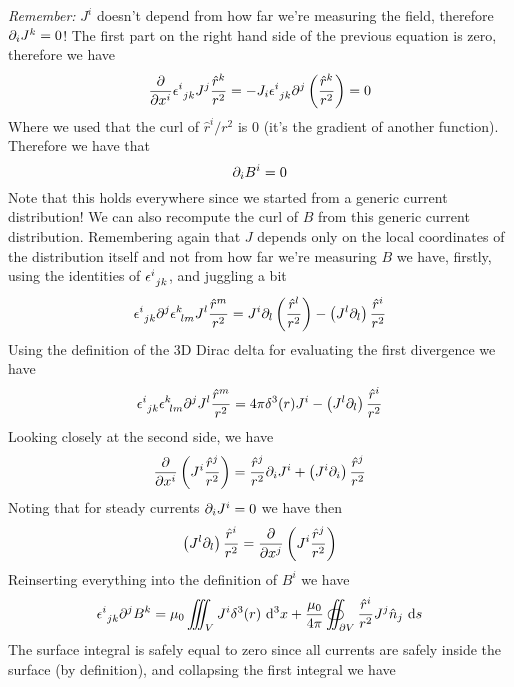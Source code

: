 \documentclass[../electromagnetism]{subfiles}
\begin{document}
\emph{Remember:} $J^i$ doesn't depend from how far we're measuring the field, therefore $\partial_iJ^k=0$! The first part on the right hand side of the previous equation is zero, therefore we have
\begin{equation}
	\pdv{x^i}\epsilon^{i}_{\ jk}J^j\frac{\hat{r}^k}{r^2}=-J_i\epsilon^{i}_{\ jk}\partial^j\left( \frac{\hat{r}^k}{r^2} \right)=0
	\label{eq:divcrosscurrent}
\end{equation}
Where we used that the curl of $\hat{r}^i/r^2$ is 0 (it's the gradient of another function). Therefore we have that
\begin{equation}
	\partial_iB^i=0
	\label{eq:divB}
\end{equation}
Note that this holds everywhere since we started from a generic current distribution! We can also recompute the curl of $B$ from this generic current distribution. Remembering again that $J$ depends only on the local coordinates of the distribution itself and not from how far we're measuring $B$ we have, firstly, using the identities of $\epsilon^{i}_{\ jk}$, and juggling a bit
\begin{equation}
	\epsilon^{i}_{\ jk}\partial^j\epsilon^{k}_{\ lm}J^l\frac{\hat{r}^m}{r^2}=J^i\partial_l\left( \frac{\hat{r}^l}{r^2} \right)-\left(J^l\partial_l\right)\frac{\hat{r}^i}{r^2}
	\label{eq:lcidentitescurlb}
\end{equation}
Using the definition of the 3D Dirac delta for evaluating the first divergence we have
\begin{equation}
	\epsilon^{i}_{\ jk}\epsilon^{k}_{\ lm}\partial^jJ^l\frac{\hat{r}^m}{r^2}=4\pi\delta^3(r)J^i-\left( J^l\partial_l \right)\frac{\hat{r}^i}{r^2}
	\label{eq:fixedabit}
\end{equation}
Looking closely at the second side, we have
\begin{equation*}
	\pdv{x^i}\left( J^i\frac{\hat{r}^j}{r^2} \right)=\frac{\hat{r}^j}{r^2}\partial_iJ^i+\left(J^i\partial_i\right)\frac{\hat{r}^j}{r^2}
\end{equation*}
Noting that for steady currents $\partial_iJ^i=0$ we have then
\begin{equation*}
	\left( J^l\partial_l \right)\frac{\hat{r}^i}{r^2}=\pdv{x^j}\left( J^i\frac{\hat{r}^j}{r^2} \right)
\end{equation*}
Reinserting everything into the definition of $B^i$ we have
\begin{equation}
	\epsilon^{i}_{\ jk}\partial^jB^k=\mu_0\iiint_VJ^i\delta^3(r)\ \mathrm{d}^3x+\frac{\mu_0}{4\pi}\oiint_{\partial V}\frac{\hat{r}^i}{r^2}J^j\hat{n}_j\ \mathrm{d} s
	\label{eq:curlBfirst}
\end{equation}
The surface integral is safely equal to zero since all currents are safely inside the surface (by definition), and collapsing the first integral we have
\end{document}
